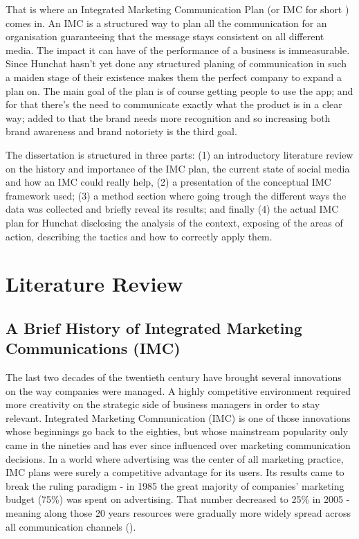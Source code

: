\documentclass[12pt]{article}
\begin{document}
That is where an Integrated Marketing Communication Plan (or IMC for short ) comes in. An IMC is a structured way to plan all the communication for an organisation guaranteeing that the message stays consistent on all different media. The impact it can have of the performance of a business is immeasurable. Since Hunchat hasn't yet done any structured planing of communication in such a maiden stage of their existence makes them the perfect company to expand a plan on. The main goal of the plan is of course getting people to use the app; and for that there's the need to communicate exactly what the product is in a clear way; added to that the brand needs more recognition and so increasing both brand awareness and brand notoriety is the third goal.

The dissertation is structured in three parts: (1) an introductory literature review on the history and importance of the IMC plan, the current state of social media and how an IMC could really help, (2) a presentation of the conceptual IMC framework used; (3) a method section where going trough the different ways the data was collected and briefly reveal its results; and finally (4) the actual IMC plan for Hunchat disclosing the analysis of the context, exposing of the areas of action, describing the tactics and how to correctly apply them.

\newpage	
\section{Literature Review}\label{review}
\subsection{A Brief History of Integrated Marketing Communications (IMC)}\label{IMC}
The last two decades of the twentieth century have brought several innovations on the way companies were managed. A highly competitive environment required more creativity on the strategic side of business managers in order to stay relevant. Integrated Marketing Communication (IMC) is one of those innovations whose beginnings go back to the eighties, but whose mainstream popularity only came in the nineties and has ever since influenced over marketing communication decisions. In a world where advertising was the center of all marketing practice, IMC plans were surely a competitive advantage for its users. Its results came to break the ruling paradigm - in 1985 the great majority  of companies' marketing budget (75\%) was spent on advertising. That number decreased to 25\% in 2005 - meaning along those 20 years resources were gradually more widely spread across all communication channels (\cite{holm}).  
\end{document}
